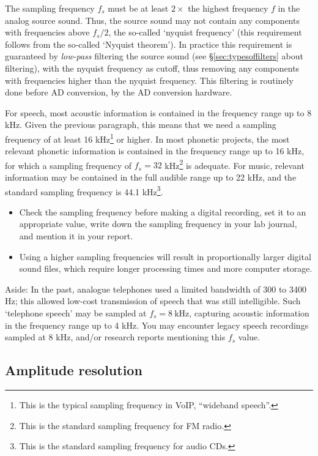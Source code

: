 \documentclass[
]{book}
\begin{document}
\protect{}\label{box-nyquist}
The sampling frequency \(f_s\) must be at least \(2 \times\) the highest frequency \(f\) in the analog source sound. Thus, the source sound may not contain any components with frequencies above \(f_s / 2\), the so-called `nyquist frequency' (this requirement follows from the so-called `Nyquist theorem'). In practice this requirement is guaranteed by \emph{low-pass} filtering the source sound (see §\ref{sec:typesoffilters} about filtering), with the nyquist frequency as cutoff, thus removing any components with frequencies higher than the nyquist frequency. This filtering is routinely done before AD conversion, by the AD conversion hardware.

For speech, most acoustic information is contained in the frequency range up to 8 kHz. Given the previous paragraph, this means that we need a sampling frequency of at least 16 kHz\footnote{This is the typical sampling frequency in VoIP, ``wideband speech''.} or higher. In most phonetic projects, the most relevant phonetic information is contained in the frequency range up to 16 kHz, for which a sampling frequency of \(f_s = 32\) kHz\footnote{This is the standard sampling frequency for FM radio.} is adequate.
For music, relevant information may be contained in the full audible range up to 22 kHz, and the standard sampling frequency is 44.1 kHz\footnote{This is the standard sampling frequency for audio CDs.}.

\begin{itemize}
\item
  Check the sampling frequency before making a digital recording, set it to an appropriate value, write down the sampling frequency in your lab journal, and mention it in your report.
\item
  Using a higher sampling frequencies will result in proportionally larger digital sound files, which require longer processing times and more computer storage.
\end{itemize}

\protect{}\label{box:telephonebandwidth}
Aside: In the past, analogue telephones used a limited bandwidth of 300 to 3400 Hz; this allowed low-cost transmission of speech that was still intelligible. Such `telephone speech' may be sampled at \(f_s = 8\ \textrm{kHz}\), capturing acoustic information in the frequency range up to 4 kHz. You may encounter legacy speech recordings sampled at 8 kHz, and/or research reports mentioning this \(f_s\) value.

\subsection{Amplitude resolution}\label{amplitude-resolution}
\end{document}
